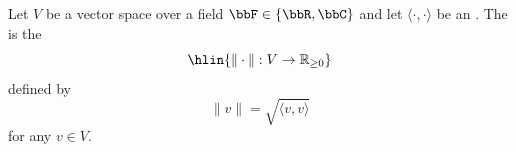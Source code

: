 \begin{definition} \label{definition:norm_induced_by_an_inner_product_on_a_real_or_complex_vector_space}
    Let $V$ be a vector space over a field $\bbF \in \{\bbR, \bbC\}$ and let $\langle \cdot, \cdot \rangle$ be an . The  is the 
    $$\hlin{\|\cdot\|: V \to \mathbb{R}_{\geq 0}}$$
    defined by
    $$\| v \| = \sqrt{\langle v, v \rangle}$$
    for any $v \in V$.
\end{definition}